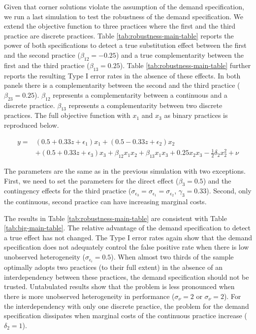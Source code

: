 \documentclass[12pt]{article}
\begin{document}
Given that corner solutions violate the assumption of the demand specification, we run a last simulation to test the robustness of the demand specification. We extend the objective function to three practices where the first and the third practice are discrete practices. Table \ref{tab:robustness-main-table} reports the power of both specifications to detect a true substitution effect between the first and the second practice ($\beta_{12} = -0.25$) and a true complementarity between the first and the third practice ($\beta_{13} = 0.25$). Table \ref{tab:robustness-main-table} further reports the resulting Type I error rates in the absence of these effects. In both panels there is a complementarity between the second and the third practice ($\beta_{23} = 0.25$). $\beta_{12}$ represents a complementarity between a continuous and a discrete practice. $\beta_{13}$ represents a complementarity between two discrete practices. The full objective function with $x_1$ and $x_3$ as binary practices is reproduced below.

\begin{align*}
\label{eq:contingent-complement}
y = &(0.5 + 0.33 z + \epsilon_1) x_1 + (0.5 - 0.33 z + \epsilon_2) x_2 \\ 
    &+ (0.5 + 0.33 z + \epsilon_3) x_3 
    + \beta_{12} x_1 x_2 + \beta_{13} x_1 x_3  + 0.25 x_2 x_3 
    - \frac{1}{2} \delta_2 x^2_2 + \nu
\end{align*}


The parameters are the same as in the previous simulation with two exceptions. First, we need to set the parameters for the direct effect ($\beta_3 = 0.5$) and the contingency effects for the third practice ($\sigma_{\epsilon_3} = \sigma_{\epsilon_1} = \sigma_{\epsilon_2}$, $\gamma_3 = 0.33$). Second, only the continuous, second practice can have increasing marginal costs. 

The results in Table \ref{tab:robustness-main-table} are consistent with Table \ref{tab:big-main-table}. The relative advantage of the demand specification to detect a true effect has not changed. The Type I error rates again show that the demand specification does not adequately control the false positive rate when there is low unobserved heterogeneity ($\sigma_{\epsilon_i} = 0.5$). When almost two thirds of the sample optimally adopts two practices (to their full extent) in the absence of an interdependency between these practices, the demand specification should not be trusted. Untabulated results show that the problem is less pronounced when there is more unobserved heterogeneity in performance ($\sigma_{\nu} = 2$ or $\sigma_{\nu} = 2$). For the interdependency with only one discrete practice, the problem for the demand specification dissipates when marginal costs of the continuous practice increase ($\delta_2 = 1$). 
\end{document}

